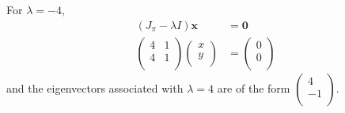 \documentclass[10pt]{article}
\begin{document}
\begin{enumerate}
        For $\lambda = -4$,
        \begin{align*}
          (J_\pi - \lambda I)\mathbf{x} &= \mathbf{0} \\
          \begin{pmatrix}
            4 & 1 \\
            4 & 1 \\
          \end{pmatrix}
          \begin{pmatrix}
            x \\
            y \\
          \end{pmatrix}
          &=
          \begin{pmatrix}
            0 \\
            0 \\
          \end{pmatrix}
        \end{align*}
        and the eigenvectors associated with $\lambda = 4$ are of the form $
          \begin{pmatrix}
            4 \\
            -1 \\
          \end{pmatrix}$.


\end{enumerate}
\end{document}
